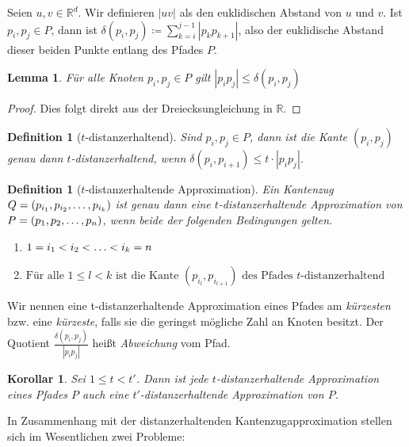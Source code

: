 \documentclass[11pt]{article}
\newcommand{\R}{\mathbb{R}}
\newtheorem{lemma}[theorem]{Lemma}
\newtheorem{definition}[theorem]{Definition}
\newtheorem{corollary}[theorem]{Korollar}
\begin{document}
    Seien $u, v \in \R^d$. Wir definieren $|uv|$ als den euklidischen Abstand von $u$ und $v$.
    Ist $p_i, p_j \in P$, dann ist $\delta(p_i, p_j) \coloneqq \sum\limits_{k=i}^{j-1}{|p_k
    p_{k+1}|}$, also der euklidische Abstand dieser beiden Punkte entlang des Pfades $P$.
	\begin{lemma}
		\label{lem:triangle}
		Für alle Knoten $p_i, p_j \in P$ gilt $|p_ip_j| \leq \delta(p_i, p_j)$
	\end{lemma}
	\begin{proof}
		Dies folgt direkt aus der Dreiecksungleichung in $\R$.
	\end{proof}
	
	\begin{definition}[$t$-distanzerhaltend]
		\label{def:t-dist}
		Sind $p_i, p_j \in P$, dann ist die Kante $(p_i, p_j)$ genau dann \emph{$t$-distanzerhaltend}, wenn $\delta(p_i, p_{i+1}) \leq t \cdot |p_ip_j|$.
	\end{definition}

	\begin{definition}[$t$-distanzerhaltende Approximation]
		\label{def:t-distapp}
		Ein Kantenzug $Q = (p_{i_1}, p_{i_2}, \mathellipsis, p_{i_k})$ ist genau dann eine \emph{$t$-distanzerhaltende Approximation von $P = (p_1, p_2, \mathellipsis, p_n)$}, wenn beide der folgenden Bedingungen gelten.
		\begin{enumerate}
			\item $\displaystyle 1 = i_1 < i_2 < \mathellipsis < i_k = n$
			\item $\displaystyle \text{Für alle } 1 \leq l < k \text{ ist die Kante } (p_{i_l}, p_{i_{l+1}}) \text{ des Pfades $t$-distanzerhaltend}$
		\end{enumerate}
	\end{definition}
	
	Wir nennen eine t-distanzerhaltende Approximation eines Pfades am \emph{kürzesten} bzw. eine \emph{kürzeste}, falls sie die geringst mögliche Zahl an Knoten besitzt.
	Der Quotient $\frac{\delta(p_i, p_j)}{|p_ip_j|}$ heißt \emph{Abweichung} vom Pfad.
	\begin{corollary}
		\label{cor:approximations}
		Sei $1 \leq t < t'$. Dann ist jede $t$-distanzerhaltende Approximation eines Pfades $P$ auch eine $t'$-distanzerhaltende Approximation von $P$.
	\end{corollary}

	In Zusammenhang mit der distanzerhaltenden Kantenzugapproximation stellen sich im Wesentlichen zwei Probleme:
	
\end{document}
